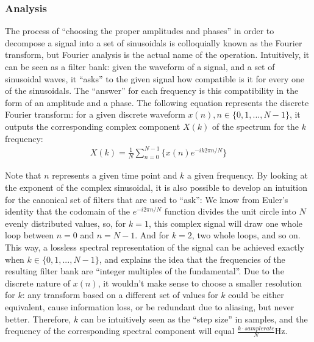 \subsubsection{Analysis}

The process of ``choosing the proper amplitudes and phases'' in order to decompose a signal into a set of sinusoidals is colloquially known as the Fourier transform, but Fourier analysis is the actual name of the operation. Intuitively, it can be seen as a filter bank: given the waveform of a signal, and a set of sinusoidal waves, it ``asks'' to the given signal how compatible is it for every one of the sinusoidals. The ``answer'' for each frequency is this compatibility in the form of an amplitude and a phase. The following equation represents the discrete Fourier transform: for a given discrete waveform \(x(n), n \in \{0, 1,..., N-1\}\), it outputs the corresponding complex component \(X(k)\) of the spectrum for the \(k\) frequency:\\

\begin{equation*}
  \begin{aligned}
    X(k) = \frac{1}{N} \sum_{n=0}^{N-1} \big\{ x(n)e^{-ik2\pi n / N} \big\}
  \end{aligned}
\end{equation*}


Note that \(n\) represents a given time point and \(k\) a given frequency. By looking at the exponent of the complex sinusoidal, it is also possible to develop an intuition for the canonical set of filters that are used to ``ask'': We know from Euler's identity that the codomain of the \(e^{-i2\pi n / N}\) function divides the unit circle into \(N\) evenly distributed values, so, for \(k=1\), this complex signal will draw one whole loop between \(n=0\) and \(n=N-1\). And for \(k=2\), two whole loops, and so on.\\

This way, a lossless spectral representation of the signal can be achieved exactly when \(k \in \{0, 1,..., N-1\}\), and explains the idea that the frequencies of the resulting filter bank are ``integer multiples of the fundamental''. Due to the discrete nature of \(x(n)\), it wouldn't make sense to choose a smaller resolution for \(k\): any transform based on a different set of values for \(k\) could be either equivalent, cause information loss, or be redundant due to aliasing, but never better. Therefore, \(k\) can be intuitively seen as the ``step size'' in samples, and the frequency of the corresponding spectral component will equal \(\frac{k\cdot samplerate}{N}\)Hz.\\

